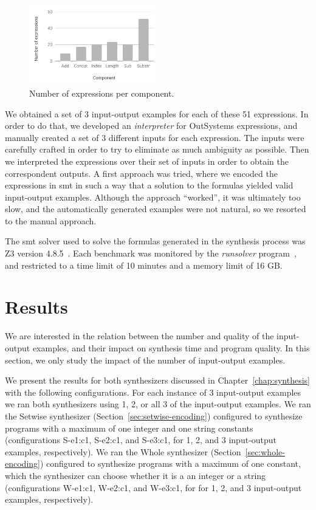 \begin{figure}
  \centering
  \includegraphics[width=0.5\textwidth]{assets/bar-chart-components-freq-51.pdf}
  \caption{Number of expressions per component.}
  \label{fig:bar-chart-components-freq-51}
\end{figure}

We obtained a set of 3 input-output examples for each of these 51 expressions.
In order to do that, we developed an \textit{interpreter} for OutSystems
expressions, and manually created a set of 3 different inputs for each
expression.
The inputs were carefully crafted in order to try to eliminate as much ambiguity
as possible.
Then we interpreted the expressions over their set of inputs in order to
obtain the correspondent outputs.
A first approach was tried, where we encoded the expressions in \gls{smt} in
such a way that a solution to the formulas yielded valid input-output examples.
Although the approach ``worked'', it was ultimately too slow, and the
automatically generated examples were not natural, so we resorted to the manual
approach.

The \gls{smt} solver used to solve the formulas generated in the synthesis
process was Z3 version 4.8.5~\cite{DeMoura:2008:ZES}.
Each benchmark was monitored by the \textit{runsolver}
program~\cite{Roussel:2011:JSAT}, and restricted to a time limit of 10 minutes
and a memory limit of 16 GB.

\section{Results}
\label{sec:results}

We are interested in the relation between the number and quality of the
input-output examples, and their impact on synthesis time and program quality.
In this section, we only study the impact of the number of input-output
examples.

We present the results for both synthesizers discussed in
Chapter~\ref{chap:synthesis} with the following configurations.
For each instance of 3 input-output examples we ran both synthesizers using 1,
2, or all 3 of the input-output examples.
We ran the Setwise synthesizer (Section~\ref{sec:setwise-encoding}) configured
to synthesize programs with a maximum of one integer and one string constants
(configurations S-e1:c1, S-e2:c1, and S-e3:c1, for 1, 2, and 3 input-output
examples, respectively).
We ran the Whole synthesizer (Section~\ref{sec:whole-encoding}) configured to
synthesize programs with a maximum of one constant, which the synthesizer can
choose whether it is a an integer or a string (configurations W-e1:c1, W-e2:c1,
and W-e3:c1, for for 1, 2, and 3 input-output examples, respectively).

